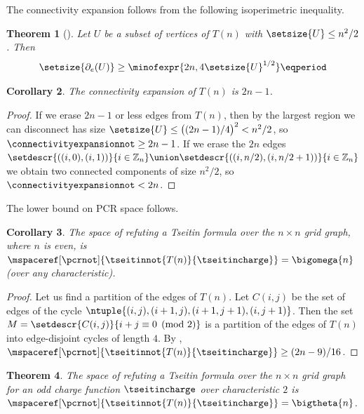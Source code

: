 \documentclass[11pt]{article}
\numberwithin{equation}{section}
\newtheorem{theorem}{Theorem}[section]
\newtheorem{corollary}[theorem]{Corollary}
\theoremstyle{definition}
\theoremstyle{plain}
\begin{document}
The connectivity expansion follows from the following isoperimetric inequality.
\begin{theorem}[\cite{BL91IsoperimetricGrid}]
  \label{th:isoperimetric-grid}
  Let $U$ be a subset of vertices of $T(n)$ with $\setsize{U}\leq n^2/2$. Then
  \begin{equation*}
    \setsize{\partial_e(U)}\geq\minofexpr{2n,4\setsize{U}^{1/2}} \eqperiod
  \end{equation*}
\end{theorem}
\begin{corollary}
  The connectivity expansion of $T(n)$ is $2n-1$.
\end{corollary}
\begin{proof}
  If we erase $2n-1$ or less edges from $T(n)$, then by  the largest region we can disconnect has size $\setsize{U}\leq\bigl((2n-1)/4\bigr)^2<n^2/2$, so $\connectivityexpansionnot\geq 2n-1$. If we erase the $2n$ edges $\setdescr{((i, 0), (i, 1))}{i \in \mathbb{Z}_n} \union \setdescr{((i, n / 2), (i, n / 2 + 1))}{i \in \mathbb{Z}_n}$ we obtain two connected components of size $n^2/2$, so $\connectivityexpansionnot<2n$.
\end{proof}

The lower bound on PCR space follows.
\begin{corollary}
  \label{cor:grid-space-lower-bound}
  The space of refuting a Tseitin formula over the $n\times n$ grid
  graph, where $n$ is even, is
  $\mspaceref[\pcrnot]{\tseitinnot{T(n)}{\tseitincharge}}=\bigomega{n}$
  (over any characteristic).
\end{corollary}
\begin{proof}
  Let us find a partition of the edges of $T(n)$. Let $C(i,j)$ be the set of edges of the cycle $\ntuple{(i,j),(i+1,j),(i+1,j+1),(i,j+1)}$. Then the set $M=\setdescr{C(i,j)}{i+j \equiv 0 \pmod{2}}$ is a partition of the edges of $T(n)$ into edge-disjoint cycles of length $4$. By , $\mspaceref[\pcrnot]{\tseitinnot{T(n)}{\tseitincharge}}\geq (2n-9)/16$.
\end{proof}

\begin{theorem} \label{th:grid-space-tight-bound}
  The space of refuting a Tseitin formula over the $n\times n$ grid graph for an odd charge function $\tseitincharge$ over characteristic $2$ is $\mspaceref[\pcrnot]{\tseitinnot{T(n)}{\tseitincharge}}=\bigtheta{n}$.
\end{theorem}
\end{document}
